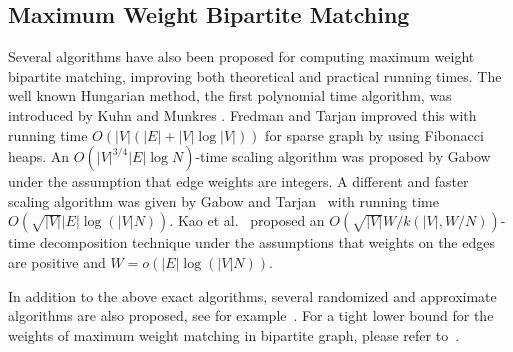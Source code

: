 \documentclass[runningheads,a4paper]{llncs}
\begin{document}
\vspace*{1cm}
\subsection{Maximum Weight Bipartite Matching}
Several algorithms have also been proposed for computing maximum weight
bipartite matching, improving both theoretical and practical running
times. The well known Hungarian method, the first polynomial time
algorithm, was introduced by Kuhn \cite{kuhn55} and Munkres
\cite{munkres57}. Fredman and Tarjan \cite{fredman87} improved this with
running time $O(|V|(|E| + |V| \log |V|))$ for sparse graph by using Fibonacci heaps. An 
$O(|V|^{3/4} |E| \log N)$-time scaling algorithm was proposed by
Gabow \cite{gabow85} under the assumption
that edge weights are integers. A different and faster scaling algorithm was given by
Gabow and Tarjan~\cite{gabow89} with running time
$O(\sqrt{|V|} |E|\log(|V|N))$. Kao et al.~\cite{kao02} proposed an
$O(\sqrt{|V|}W/k(|V|,W/N))$-time decomposition technique
under the assumptions that weights on the edges are positive and $W=o(|E|\log(|V|N))$.


In addition to the above exact algorithms, several randomized and approximate algorithms
are also proposed, see for example~\cite{duan10,sankowski09}.
For a tight lower bound for the weights of maximum weight matching in bipartite graph, please refer to~\cite{das16_TLB_arXiv}.
\end{document}
